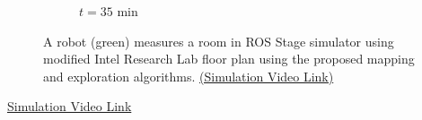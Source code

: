 \documentclass[11pt,professionalfonts,hyperref={pdftex,pdfpagemode=none,pdfstartview=FitH}]{beamer}
\begin{document}
\begin{frame}
\begin{figure}[!ht]
\begin{subfigure}[t]{0.2\columnwidth}
        \caption*{$t=35$ min}
        \label{fig:IRL35min}
    \end{subfigure}
\vspace*{-0.25cm}
    \caption*{A robot (green) measures a room in ROS Stage simulator using modified Intel Research Lab floor plan using the proposed mapping and exploration algorithms. \href{run:JIRS16_simulation_speedup10x_then_speedup100x.mov}{(Simulation Video Link)}
}
    \label{fig:IRL}
\end{figure}
\href{run:JIRS16_simulation_speedup10x_then_speedup100x.mov}{Simulation Video Link}



\end{frame}
\end{document}
